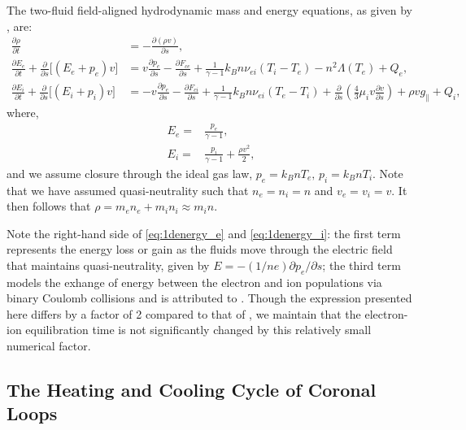 
The two-fluid field-aligned hydrodynamic mass and energy equations, as given by \citet{bradshaw_influence_2013}, are:
\begin{align}
    \frac{\partial\rho}{\partial t} &= -\frac{\partial(\rho v)}{\partial s}, \label{eq:1dmass} \\
    \frac{\partial E_e}{\partial t} + \frac{\partial}{\partial s} \lbrack(E_e+p_e)v\rbrack &= v\frac{\partial p_e}{\partial s} - \frac{\partial F_{ce}}{\partial s} + \frac{1}{\gamma - 1}k_Bn\nu_{ei}(T_i-T_e) -n^2\Lambda(T_e)+Q_{e} , \label{eq:1denergy_e} \\
    \frac{\partial E_i}{\partial t} + \frac{\partial }{\partial s}\lbrack(E_i+p_i)v\rbrack &= -v\frac{\partial p_e}{\partial s} - \frac{\partial F_{ci}}{\partial s} + \frac{1}{\gamma - 1}k_Bn\nu_{ei}(T_e-T_i) + \frac{\partial}{\partial s}\left(\frac{4}{3}\mu_iv\frac{\partial v}{\partial s}\right) +\rho v g_{\parallel} + Q_{i},\label{eq:1denergy_i}
\end{align}
where,
\begin{align}
    E_e =& \frac{p_e}{\gamma - 1} \label{eq:ee_closure}, \\
    E_i =& \frac{p_i}{\gamma - 1} + \frac{\rho v^2}{2}, \label{eq:ei_closure}
\end{align}
and we assume closure through the ideal gas law, $p_e=k_BnT_e,\,p_i=k_BnT_i$. Note that we have assumed quasi-neutrality such that $n_e=n_i=n$ and $v_e=v_i=v$. It then follows that $\rho=m_en_e+m_in_i\approx m_in$.

Note the right-hand side of \autoref{eq:1denergy_e} and \autoref{eq:1denergy_i}: the first term represents the energy loss or gain as the fluids move through the electric field that maintains quasi-neutrality, given by $E=-(1/ne)\partial p_e/\partial s$; the third term models the exhange of energy between the electron and ion populations via binary Coulomb collisions and is attributed to \citet{braginskii_transport_1965}. Though the expression presented here differs by a factor of 2 compared to that of \citeauthor{braginskii_transport_1965}, we maintain that the electron-ion equilibration time is not significantly changed by this relatively small numerical factor.

\subsection{The Heating and Cooling Cycle of Coronal Loops}\label{sec:heating-cooling-cycle}

